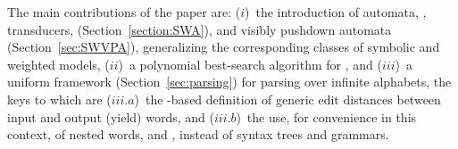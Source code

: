 The main contributions of the paper are:
($i$)~the introduction of automata, \SWA, transducers, \SWT (Section~\ref{section:SWA}),
and visibly pushdown automata \SWVPA (Section~\ref{sec:SWVPA}),
generalizing the corresponding classes of symbolic and weighted models,
($ii$)~a polynomial best-search algorithm for \SWVPA, %
and ($iii$)~a uniform framework (Section~\ref{sec:parsing}) for parsing over infinite alphabets,
the keys to which are
($iii.a$)~the \SWT-based definition of generic edit distances between input and output (yield) words,
and ($iii.b$)~the use, for convenience in this context,
of nested words, and \SWVPA,
instead of syntax trees and grammars. %


